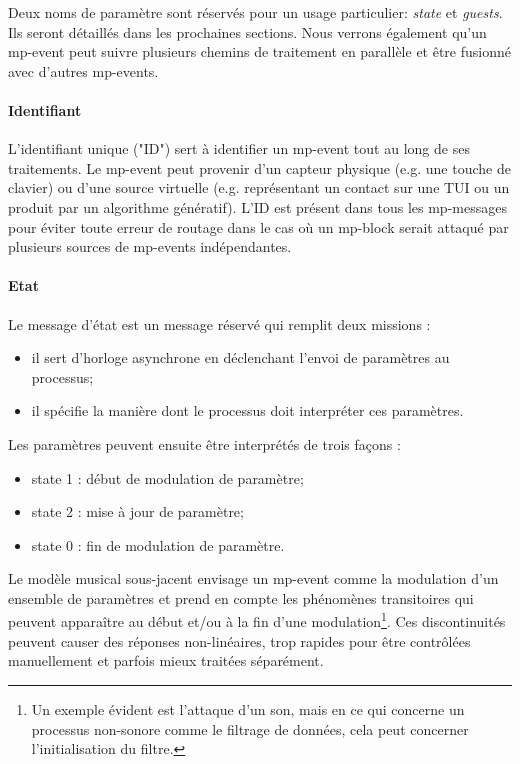 Deux noms de paramètre sont réservés pour un usage particulier: \textit{state} et \textit{guests}. Ils seront détaillés dans les prochaines sections. Nous verrons également qu'un mp-event peut suivre plusieurs chemins de traitement en parallèle et être fusionné avec d'autres mp-events. 

\paragraph{Identifiant}
L'identifiant unique ("ID") sert à identifier un mp-event tout au long de ses traitements. Le mp-event peut provenir d'un capteur physique (e.g. une touche de clavier) ou d'une source virtuelle (e.g. représentant un contact sur une \gls{TUI} ou un produit par un algorithme génératif).
L'ID est présent dans tous les mp-messages pour éviter toute erreur de routage dans le cas où un mp-block serait attaqué par plusieurs sources de mp-events indépendantes.

\paragraph{Etat}
Le message d'état est un message réservé qui remplit deux missions :
\vspace{-1em}
\begin{itemize}[noitemsep]
	\item il sert d'horloge asynchrone en déclenchant l'envoi de paramètres au processus;
	\item il spécifie la manière dont le processus doit interpréter ces paramètres.
\end{itemize}

Les paramètres peuvent ensuite être interprétés de trois façons :
\vspace{-1em}
\begin{itemize}[noitemsep]
	\item state 1 : début de modulation de paramètre;
	\item state 2 : mise à jour de paramètre;
	\item state 0 : fin de modulation de paramètre.	
\end{itemize}

Le modèle musical sous-jacent envisage un mp-event comme la modulation d'un ensemble de paramètres et prend en compte les phénomènes transitoires qui peuvent apparaître au début et/ou à la fin d'une modulation\footnote{ Un exemple évident est l'attaque d'un son, mais en ce qui concerne un processus non-sonore comme le filtrage de données, cela peut concerner l'initialisation du filtre.}. Ces discontinuités peuvent causer des réponses non-linéaires, trop rapides pour être contrôlées manuellement et parfois mieux traitées séparément.

